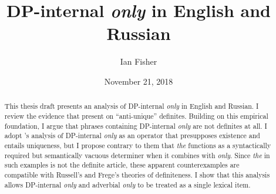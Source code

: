 \documentclass{article}
\title{DP-internal \textit{only} in English and Russian}
\author{Ian Fisher}
\date{November 21, 2018}
\begin{document}
\maketitle

\begin{abstract}
This thesis draft presents an analysis of DP-internal \textit{only} in English and Russian. I review the evidence that \citet{cb2012b, cb2015} present on ``anti-unique'' definites. Building on this empirical foundation, I argue that phrases containing DP-internal \textit{only} are not definites at all. I adopt \citeauthor{cb2015}'s analysis of DP-internal \textit{only} as an operator that presupposes existence and entails uniqueness, but I propose contrary to them that \textit{the} functions as a syntactically required but semantically vacuous determiner when it combines with \textit{only}. Since \textit{the} in such examples is not the definite article, these apparent counterexamples are compatible with Russell's and Frege's theories of definiteness. I show that this analysis allows DP-internal \textit{only} and adverbial \textit{only} to be treated as a single lexical item.
\end{abstract}












\end{document}
